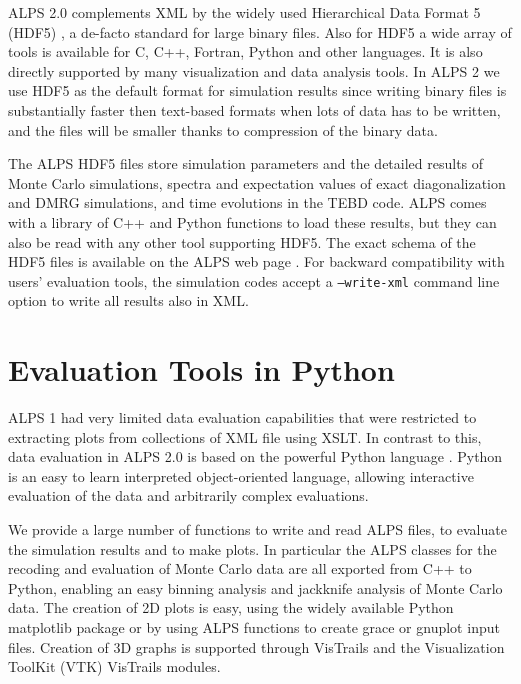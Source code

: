 \documentclass[12pt]{iopart}
\begin{document}
ALPS 2.0 complements XML by the widely used Hierarchical Data Format 5 (HDF5) \cite{hdf5}, a de-facto standard for large binary files.  Also for HDF5 a wide array of tools is available for C, C++, Fortran, Python and other languages. It is also directly supported by many visualization and data analysis tools. In ALPS 2 we use HDF5 as the default format for simulation results since writing binary files is substantially faster then text-based formats when lots of data has to be written, and the files will be smaller thanks to compression of the binary data. 

The ALPS HDF5 files store simulation parameters and the detailed results of Monte Carlo simulations, spectra and expectation values of exact diagonalization and DMRG simulations, and time evolutions in the TEBD code. ALPS comes with a library of C++ and Python functions to load these results, but they can also be read with any other tool supporting HDF5. The exact schema of the HDF5 files is available on the ALPS web page \cite{alps}. For backward compatibility with users' evaluation tools, the simulation codes accept a {\tt --write-xml} command line option to write all results also in XML. 

\section{Evaluation Tools in Python}

ALPS 1 had very limited data evaluation capabilities that were restricted to extracting plots from collections of XML file using XSLT. In contrast to this, data evaluation in ALPS 2.0 is based on the powerful Python language \cite{python}. Python is an easy to learn interpreted object-oriented language, allowing interactive evaluation of the data and arbitrarily complex evaluations. 

We provide a large number of functions to write and read ALPS files, to evaluate the simulation results and to make plots. In particular the ALPS classes for the recoding and evaluation of Monte Carlo data are all exported from C++ to Python, enabling an easy binning analysis \cite{Ambegaokar2010} and jackknife analysis of Monte Carlo data.
The creation of 2D plots is easy, using the widely available Python matplotlib package \cite{matplotlib} or by using ALPS functions to create grace \cite{grace} or gnuplot \cite{gnuplot} input files. Creation of 3D graphs is supported through VisTrails and the Visualization ToolKit (VTK) \cite{vtk} VisTrails modules.
\end{document}
